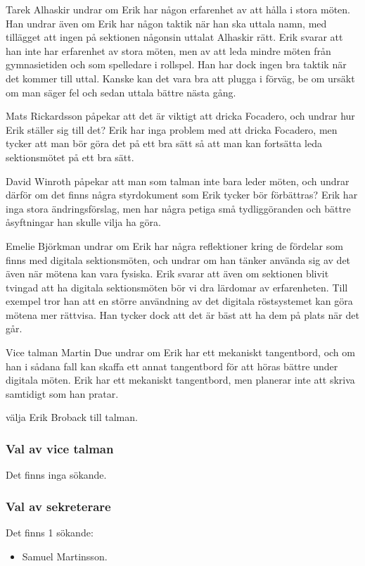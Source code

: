 \documentclass[hidelinks]{sektionsmote}
\begin{document}
Tarek Alhaskir undrar om Erik har någon erfarenhet av att hålla i stora möten.
Han undrar även om Erik har någon taktik när han ska uttala namn, med tillägget att ingen på sektionen någonsin uttalat Alhaskir rätt.
Erik svarar att han inte har erfarenhet av stora möten, men av att leda mindre möten från gymnasietiden och som spelledare i rollspel.
Han har dock ingen bra taktik när det kommer till uttal.
Kanske kan det vara bra att plugga i förväg, be om ursäkt om man säger fel och sedan uttala bättre nästa gång.

Mats Rickardsson påpekar att det är viktigt att dricka Focadero, och undrar hur Erik ställer sig till det?
Erik har inga problem med att dricka Focadero, men tycker att man bör göra det på ett bra sätt så att man kan fortsätta leda sektionsmötet på ett bra sätt.

David Winroth påpekar att man som talman inte bara leder möten, och undrar därför om det finns några styrdokument som Erik tycker bör förbättras?
Erik har inga stora ändringsförslag, men har några petiga små tydliggöranden och bättre åsyftningar han skulle vilja ha göra.

Emelie Björkman undrar om Erik har några reflektioner kring de fördelar som finns med digitala sektionsmöten, och undrar om han tänker använda sig av det även när mötena kan vara fysiska.
Erik svarar att även om sektionen blivit tvingad att ha digitala sektionsmöten bör vi dra lärdomar av erfarenheten.
Till exempel tror han att en större användning av det digitala röstsystemet kan göra mötena mer rättvisa.
Han tycker dock att det är bäst att ha dem på plats när det går.

Vice talman Martin Due undrar om Erik har ett mekaniskt tangentbord, och om han i sådana fall kan skaffa ett annat tangentbord för att höras bättre under digitala möten.
Erik har ett mekaniskt tangentbord, men planerar inte att skriva samtidigt som han pratar.

\begin{beslut}
  \item välja Erik Broback till talman.
\end{beslut}

\subsubsection{Val av vice talman}
Det finns inga sökande.

\subsubsection{Val av sekreterare}
Det finns 1 sökande:
\begin{itemize}
    \item Samuel Martinsson.
\end{itemize}
\end{document}
